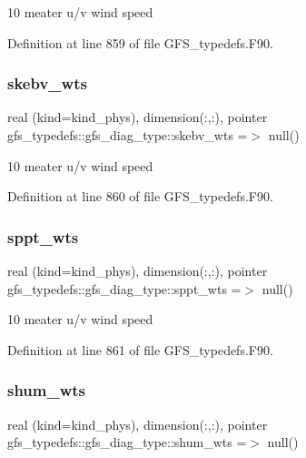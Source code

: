 10 meater u/v wind speed 



Definition at line 859 of file G\+F\+S\+\_\+typedefs.\+F90.

\mbox{\label{structgfs__typedefs_1_1gfs__diag__type_aa0570e866cb0bf0a33c3c5e349dd730e}} 
\subsubsection{skebv\+\_\+wts}
{\footnotesize\ttfamily real (kind=kind\+\_\+phys), dimension(\+:,\+:), pointer gfs\+\_\+typedefs\+::gfs\+\_\+diag\+\_\+type\+::skebv\+\_\+wts =$>$ null()}



10 meater u/v wind speed 



Definition at line 860 of file G\+F\+S\+\_\+typedefs.\+F90.

\mbox{\label{structgfs__typedefs_1_1gfs__diag__type_a3d7186f4439a4a40297f7daa89355277}} 
\subsubsection{sppt\+\_\+wts}
{\footnotesize\ttfamily real (kind=kind\+\_\+phys), dimension(\+:,\+:), pointer gfs\+\_\+typedefs\+::gfs\+\_\+diag\+\_\+type\+::sppt\+\_\+wts =$>$ null()}



10 meater u/v wind speed 



Definition at line 861 of file G\+F\+S\+\_\+typedefs.\+F90.

\mbox{\label{structgfs__typedefs_1_1gfs__diag__type_a6e77fbf122d9831cfbb0c14633f0ad78}} 
\subsubsection{shum\+\_\+wts}
{\footnotesize\ttfamily real (kind=kind\+\_\+phys), dimension(\+:,\+:), pointer gfs\+\_\+typedefs\+::gfs\+\_\+diag\+\_\+type\+::shum\+\_\+wts =$>$ null()}



